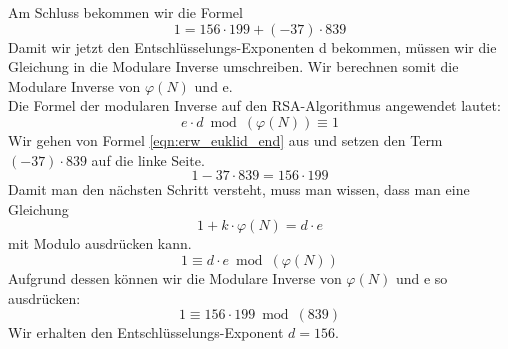 %
Am Schluss bekommen wir die Formel
%
\begin{equation*}
 1 = 156 \cdot 199 + (-37) \cdot 839
 \label{eqn:erw_euklid_end}
\end{equation*}
%
Damit wir jetzt den Entschlüsselungs-Exponenten d bekommen, müssen wir die Gleichung in die Modulare Inverse umschreiben. Wir berechnen somit die Modulare Inverse von $\varphi(N)$ und e.\\
Die Formel der modularen Inverse auf den RSA-Algorithmus angewendet lautet:
\begin{equation}
  e \cdot d \bmod(\varphi(N)) \equiv 1
\end{equation}
%
Wir gehen von Formel \ref{eqn:erw_euklid_end} aus und setzen den Term $(-37) \cdot 839$ auf die linke Seite.
%
\begin{equation*}
 1 - 37 \cdot 839 = 156 \cdot 199
\end{equation*}
Damit man den nächsten Schritt versteht, muss man wissen, dass man eine Gleichung
\begin{equation*}
  1 + k \cdot \varphi(N) = d \cdot e
\end{equation*}
mit Modulo ausdrücken kann.
\begin{equation*}
  1 \equiv d \cdot e \bmod(\varphi(N))
  \label{eqn:erw_eukl_fertig}
\end{equation*}
%
Aufgrund dessen können wir die Modulare Inverse von $\varphi(N)$ und e so ausdrücken:
%
\begin{equation*}
 1 \equiv 156 \cdot 199 \bmod(839)
\end{equation*}
Wir erhalten den Entschlüsselungs-Exponent $d = 156$.
%
%
%
%
%
